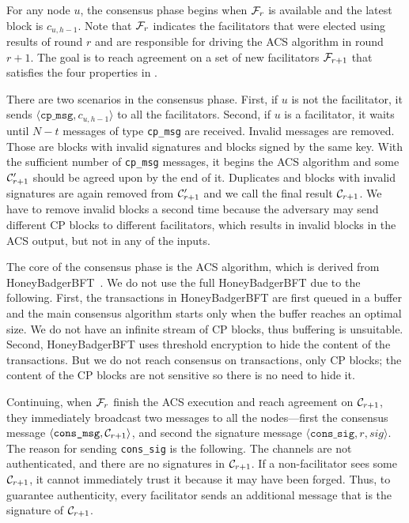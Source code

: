 For any node $u$,
the consensus phase begins when $\mathcal{F}_r$ is available and the latest block is $c_{u, h-1}$.
Note that $\mathcal{F}_r$ indicates the facilitators that were elected using results of round $r$ and are responsible for driving the ACS algorithm in round $r + 1$.
The goal is to reach agreement on a set of new facilitators $\mathcal{F}_{r + 1}$ that satisfies the four properties in .

There are two scenarios in the consensus phase.
First, if $u$ is not the facilitator, it sends $\langle \texttt{cp\_msg}, c_{u, h-1} \rangle$ to all the facilitators.
Second, if $u$ is a facilitator, it waits until $N - t$ messages of type \texttt{cp\_msg} are received.
Invalid messages are removed.
Those are blocks with invalid signatures and blocks signed by the same key.
With the sufficient number of \texttt{cp\_msg} messages,
it begins the ACS algorithm and some $\mathcal{C}'_{r + 1}$ should be agreed upon by the end of it.
Duplicates and blocks with invalid signatures are again removed from $\mathcal{C}'_{r+1}$ and we call the final result $\mathcal{C}_{r+1}$.
We have to remove invalid blocks a second time because the adversary may send different CP blocks to different facilitators,
which results in invalid blocks in the ACS output, but not in any of the inputs.

The core of the consensus phase is the ACS algorithm,
which is derived from HoneyBadgerBFT~\cite{miller2016honey}.
We do not use the full HoneyBadgerBFT due to the following.
First, the transactions in HoneyBadgerBFT are first queued in a buffer and the main consensus algorithm starts only when the buffer reaches an optimal size.
We do not have an infinite stream of CP blocks, thus buffering is unsuitable.
Second, HoneyBadgerBFT uses threshold encryption to hide the content of the transactions.
But we do not reach consensus on transactions, only CP blocks;
the content of the CP blocks are not sensitive so there is no need to hide it.

Continuing, when $\mathcal{F}_{r}$ finish the ACS execution and reach agreement on $\mathcal{C}_{r+1}$,
they immediately broadcast two messages to all the nodes---first the consensus message $\langle \texttt{cons\_msg}, \mathcal{C}_{r+1} \rangle$,
and second the signature message $\langle \texttt{cons\_sig}, r, sig \rangle$.
The reason for sending \texttt{cons\_sig} is the following.
The channels are not authenticated, 
and there are no signatures in $\mathcal{C}_{r + 1}$.
If a non-facilitator sees some $\mathcal{C}_{r + 1}$, it cannot immediately trust it because it may have been forged.
Thus, to guarantee authenticity, every facilitator sends an additional message that is the signature of $\mathcal{C}_{r + 1}$.

